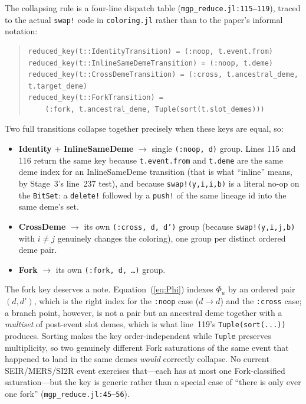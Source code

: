 \documentclass[11pt,leqno]{article}
\newcommand{\code}[1]{\texttt{#1}}
\theoremstyle{plain}
\theoremstyle{definition}
\begin{document}
The collapsing rule is a four-line dispatch table
(\code{mgp\_reduce.jl:115--119}), traced to the actual \code{swap!} code in
\code{coloring.jl} rather than to the paper's informal notation:
\begin{quote}
{\small
\begin{verbatim}
reduced_key(t::IdentityTransition) = (:noop, t.event.from)
reduced_key(t::InlineSameDemeTransition) = (:noop, t.deme)
reduced_key(t::CrossDemeTransition) = (:cross, t.ancestral_deme, t.target_deme)
reduced_key(t::ForkTransition) =
    (:fork, t.ancestral_deme, Tuple(sort(t.slot_demes)))
\end{verbatim}
}
\end{quote}
Two full transitions collapse together precisely when these keys are equal,
so:
\begin{itemize}
  \item \textbf{Identity} $+$ \textbf{InlineSameDeme} $\to$ single
    \code{(:noop, d)} group.  Lines 115 and 116 return the same key because
    \code{t.event.from} and \code{t.deme} are the same deme index for an
    InlineSameDeme transition (that is what ``inline'' means, by Stage~3's
    line~237 test), and because \code{swap!(y,i,i,b)} is a literal no-op on
    the \code{BitSet}: a \code{delete!} followed by a \code{push!} of the same
    lineage id into the same deme's set.
  \item \textbf{CrossDeme} $\to$ its own \code{(:cross, d, d')} group
    (because \code{swap!(y,i,j,b)} with $i \ne j$ genuinely changes the
    coloring), one group per distinct ordered deme pair.
  \item \textbf{Fork} $\to$ its own \code{(:fork, d, \ldots)} group.
\end{itemize}
The fork key deserves a note.  Equation~(\ref{eq:Phi}) indexes $\Phi_u$ by an
ordered pair $(d,d')$, which is the right index for the \code{:noop} case
($d\to d$) and the \code{:cross} case; a branch point, however, is not a pair
but an ancestral deme together with a \emph{multiset} of post-event slot
demes, which is what line~119's \code{Tuple(sort(...))} produces.  Sorting
makes the key order-independent while \code{Tuple} preserves multiplicity, so
two genuinely different Fork saturations of the same event that happened to
land in the same demes \emph{would} correctly collapse.  No current
SEIR/MERS/SI2R event exercises that---each has at most one Fork-classified
saturation---but the key is generic rather than a special case of ``there is
only ever one fork'' (\code{mgp\_reduce.jl:45--56}).
\end{document}
